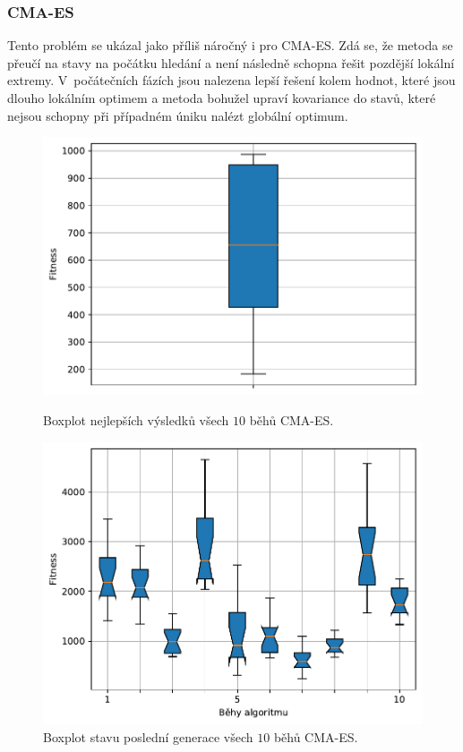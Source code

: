 \subsubsection{CMA-ES}
Tento problém se ukázal jako příliš náročný i pro CMA-ES. Zdá se, že metoda se přeučí na stavy na počátku hledání a není následně schopna řešit pozdější lokální extremy. V~počátečních fázích jsou nalezena lepší řešení kolem hodnot, které jsou dlouho lokálním optimem a metoda bohužel upraví kovariance do stavů, které nejsou schopny při případném úniku nalézt globální optimum.

\begin{figure}[H]
    \begin{minipage}[t]{0.475\linewidth}
        \includegraphics[width=\linewidth]{obrazky-figures/statistics/HIFU/flower/15/CMAES/bestsBoxplot_WithOutliers.pdf}
        \caption{Boxplot nejlepších výsledků všech $10$ běhů CMA-ES.}
        \label{fg:hifu:flower:cmaes:best}
        \end{minipage}
        \hfill
        \begin{minipage}[t]{0.475\linewidth}
        \includegraphics[width=\linewidth]{obrazky-figures/statistics/HIFU/flower/15/CMAES/lastGenBoxplots.pdf}
        \caption{Boxplot stavu poslední generace všech $10$ běhů CMA-ES.}
        \label{fg:hifu:flower:cmaes:lastGen}
    \end{minipage}
\end{figure}

